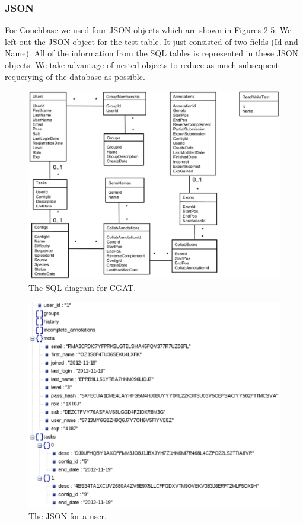 \documentclass[]{IEEEtran}
\begin{document}
\subsubsection{JSON}
For Couchbase we used four JSON objects which are shown in Figures 2-5. We left
out the JSON object for the test table. It just consisted of two fields (Id and
Name). All of the information from the SQL tables is represented in these JSON
objects. We take advantage of nested objects to reduce as much subsequent
requerying of the database as possible.

\begin{figure}
	\includegraphics[width=5.5in]{SQLDiagram.eps}
	\caption{The SQL diagram for CGAT.}
	\label{fig:SQLDiagram}
\end{figure}


\begin{figure}%
	\includegraphics{user.eps}
	\caption{The JSON for a user.}
	\label{fig:JSON-user}
\end{figure}%
\end{document}
